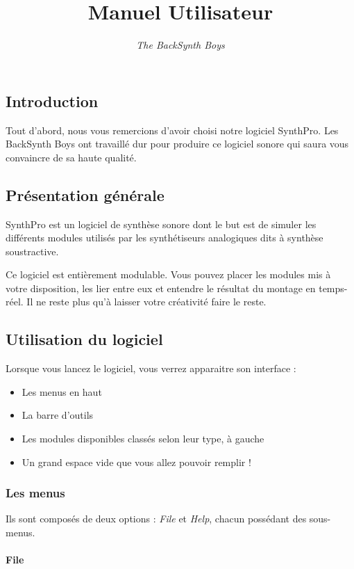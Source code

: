 \documentclass[a4paper,oneside,frenchb,12pt]{article}
\title{Manuel Utilisateur}
\author{\emph{The BackSynth Boys}}
\begin{document}
\maketitle

\subsection{Introduction}

Tout d'abord, nous vous remercions d'avoir choisi notre logiciel
SynthPro. Les BackSynth Boys ont travaillé dur pour produire ce logiciel
sonore qui saura vous convaincre de sa haute qualité.

\subsection{Présentation générale}

SynthPro est un logiciel de synthèse sonore dont le but est de simuler
les différents modules utilisés par les synthétiseurs analogiques dits à
synthèse soustractive.

Ce logiciel est entièrement modulable. Vous pouvez placer les modules
mis à votre disposition, les lier entre eux et entendre le résultat du
montage en temps-réel. Il ne reste plus qu'à laisser votre créativité
faire le reste.

\subsection{Utilisation du logiciel}

Lorsque vous lancez le logiciel, vous verrez apparaitre son interface :

\begin{itemize}
\item
  Les menus en haut
\item
  La barre d'outils
\item
  Les modules disponibles classés selon leur type, à gauche
\item
  Un grand espace vide que vous allez pouvoir remplir !
\end{itemize}
\subsubsection{Les menus}

Ils sont composés de deux options : \emph{File} et \emph{Help}, chacun possédant des
sous-menus.

\paragraph{File}
\end{document}
